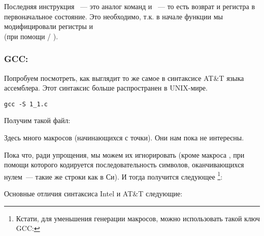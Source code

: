 Последняя инструкция \LEAVE~--- это аналог команд  и ~--- то есть возврат  и регистра \EBP в первоначальное состояние.
Это необходимо, т.к. в начале функции мы модифицировали регистры \ESP и \EBP{}\\
(при помощи  / ).

\subsubsection{GCC: \ATTSyntax}
\label{ATT_syntax}

Попробуем посмотреть, как выглядит то же самое в синтаксисе AT\&T языка ассемблера.
Этот синтаксис больше распространен в UNIX-мире.

\begin{lstlisting}[caption=компилируем в GCC 4.7.3]
gcc -S 1_1.c
\end{lstlisting}

Получим такой файл:



Здесь много макросов (начинающихся с точки). Они нам пока не интересны.

Пока что, ради упрощения, мы можем 
их игнорировать (кроме макроса , при помощи которого кодируется последовательность символов, 
оканчивающихся нулем~--- такие же строки как в Си). И тогда получится следующее
\footnote{Кстати, для уменьшения генерации  макросов, можно использовать такой ключ GCC: }:



\myindex{\ATTSyntax}
\myindex{\IntelSyntax}
Основные отличия синтаксиса Intel и AT\&T следующие:

